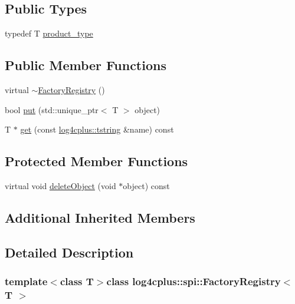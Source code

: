 \subsection*{Public Types}
\begin{DoxyCompactItemize}
\item 
typedef T \hyperlink{classlog4cplus_1_1spi_1_1FactoryRegistry_a9c8134597fb85e45d8feac0053c7a353}{product\-\_\-type}
\end{DoxyCompactItemize}
\subsection*{Public Member Functions}
\begin{DoxyCompactItemize}
\item 
virtual \hyperlink{classlog4cplus_1_1spi_1_1FactoryRegistry_a5b698a5c12f0bc714c52f6e4d52dcb86}{$\sim$\-Factory\-Registry} ()
\item 
bool \hyperlink{classlog4cplus_1_1spi_1_1FactoryRegistry_a24dc4dfa2a6d49a4e489e8a963433c0a}{put} (std\-::unique\-\_\-ptr$<$ T $>$ object)
\item 
T $\ast$ \hyperlink{classlog4cplus_1_1spi_1_1FactoryRegistry_a941bd685355ca54336103aa94e4cf986}{get} (const \hyperlink{namespacelog4cplus_a3c9287f6ebcddc50355e29d71152117b}{log4cplus\-::tstring} \&name) const 
\end{DoxyCompactItemize}
\subsection*{Protected Member Functions}
\begin{DoxyCompactItemize}
\item 
virtual void \hyperlink{classlog4cplus_1_1spi_1_1FactoryRegistry_a77accd76c66b710e4ff566692d768bf2}{delete\-Object} (void $\ast$object) const 
\end{DoxyCompactItemize}
\subsection*{Additional Inherited Members}


\subsection{Detailed Description}
\subsubsection*{template$<$class T$>$class log4cplus\-::spi\-::\-Factory\-Registry$<$ T $>$}

